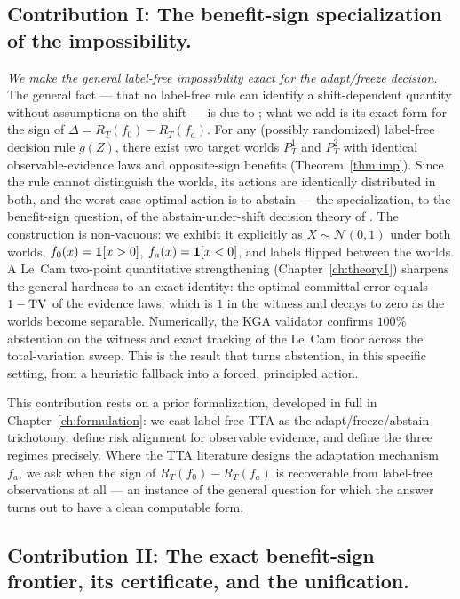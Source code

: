 \subsection*{Contribution I: The benefit-sign specialization of the impossibility.}

\emph{We make the general label-free impossibility exact for the adapt/freeze
decision.} The general fact --- that no label-free rule can identify a
shift-dependent quantity without assumptions on the shift --- is due to
\cite{garg2022atc,kalai2021abstain}; what we add is its exact form for the sign of
$\Delta = R_T(f_0) - R_T(f_a)$. For any (possibly randomized) label-free decision
rule $g(Z)$, there exist two target worlds $P_T^1$ and $P_T^2$ with identical
observable-evidence laws and opposite-sign benefits (Theorem~\ref{thm:imp}). Since
the rule cannot distinguish the worlds, its actions are identically distributed in
both, and the worst-case-optimal action is to abstain --- the specialization, to
the benefit-sign question, of the abstain-under-shift decision theory of
\cite{kalai2021abstain}. The construction is non-vacuous: we exhibit it explicitly
as $X \sim \mathcal{N}(0,1)$ under both worlds, $f_0(x) = \mathbf{1}[x>0]$,
$f_a(x) = \mathbf{1}[x<0]$, and labels flipped between the worlds. A Le~Cam two-point
quantitative strengthening (Chapter~\ref{ch:theory1}) sharpens the general hardness
to an exact identity: the optimal committal error equals $1 - \mathrm{TV}$ of the evidence
laws, which is $1$ in the witness and decays to zero as the worlds become
separable. Numerically, the KGA validator confirms $100\%$ abstention on the
witness and exact tracking of the Le~Cam floor across the total-variation sweep.
This is the result that turns abstention, in this specific setting, from a heuristic
fallback into a forced, principled action.

This contribution rests on a prior formalization, developed in full in
Chapter~\ref{ch:formulation}: we cast label-free TTA as the adapt/freeze/abstain
trichotomy, define risk alignment for observable evidence, and define the three
regimes precisely. Where the TTA literature designs the adaptation
mechanism~$f_a$, we ask when the sign of $R_T(f_0) - R_T(f_a)$ is recoverable
from label-free observations at all --- an instance of the general question
\cite{garg2022atc,kalai2021abstain} for which the answer turns out to have a clean
computable form.

\subsection*{Contribution II: The exact benefit-sign frontier, its certificate, and the unification.}

